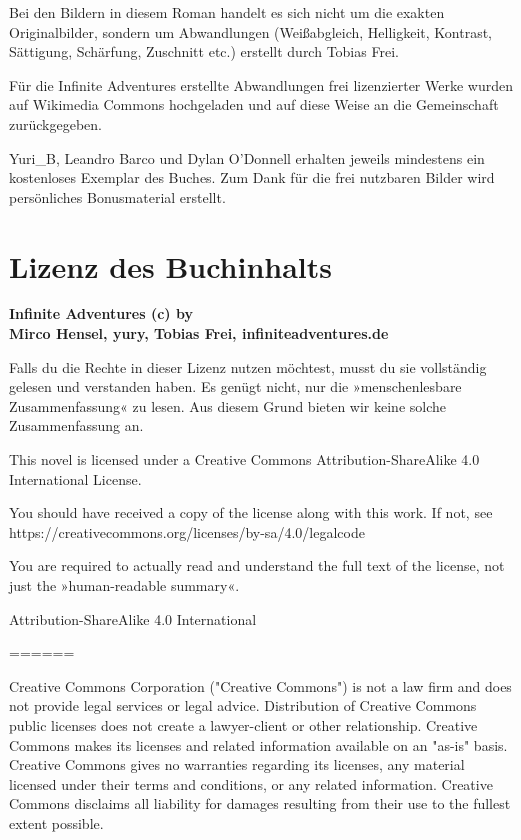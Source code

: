 Bei den Bildern in diesem Roman handelt es sich nicht um die exakten Originalbilder, sondern um Abwandlungen (Weißabgleich, Helligkeit, Kontrast, Sättigung, Schärfung, Zuschnitt etc.) erstellt durch Tobias Frei.

Für die Infinite Adventures erstellte Abwandlungen frei lizenzierter Werke wurden auf Wikimedia Commons hochgeladen und auf diese Weise an die Gemeinschaft zurückgegeben.

Yuri\_B, Leandro Barco und Dylan O'Donnell erhalten jeweils mindestens ein kostenloses Exemplar des Buches. Zum Dank für die frei nutzbaren Bilder wird persönliches Bonusmaterial erstellt.


\chapter{Lizenz des Buchinhalts}

\textbf{Infinite Adventures (c) by\\ Mirco Hensel, yury, Tobias Frei, infiniteadventures.de}

Falls du die Rechte in dieser Lizenz nutzen möchtest, musst du sie vollständig gelesen und verstanden haben. Es genügt nicht, nur die »menschenlesbare Zusammenfassung« zu lesen. Aus diesem Grund bieten wir keine solche Zusammenfassung an.

This novel is licensed under a
Creative Commons Attribution-ShareAlike 4.0 International License.

You should have received a copy of the license along with this
work. If not, see https://creativecommons.org/licenses/by-sa/4.0/legalcode

You are required to actually read and understand the full text of the license, not just the »human-readable summary«.

Attribution-ShareAlike 4.0 International

======

Creative Commons Corporation ("Creative Commons") is not a law firm and
does not provide legal services or legal advice. Distribution of
Creative Commons public licenses does not create a lawyer-client or
other relationship. Creative Commons makes its licenses and related
information available on an "as-is" basis. Creative Commons gives no
warranties regarding its licenses, any material licensed under their
terms and conditions, or any related information. Creative Commons
disclaims all liability for damages resulting from their use to the
fullest extent possible.

